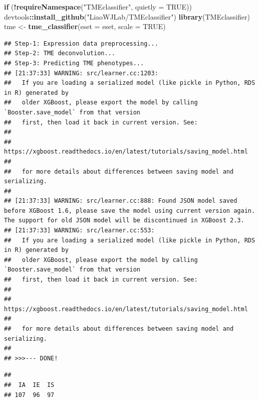 \documentclass[
  12pt,
]{book}
\newenvironment{Shaded}{\begin{snugshade}}{\end{snugshade}}
\newcommand{\AttributeTok}[1]{\textcolor[rgb]{0.13,0.29,0.53}{#1}}
\newcommand{\ConstantTok}[1]{\textcolor[rgb]{0.56,0.35,0.01}{#1}}
\newcommand{\ControlFlowTok}[1]{\textcolor[rgb]{0.13,0.29,0.53}{\textbf{#1}}}
\newcommand{\FunctionTok}[1]{\textcolor[rgb]{0.13,0.29,0.53}{\textbf{#1}}}
\newcommand{\NormalTok}[1]{#1}
\newcommand{\OtherTok}[1]{\textcolor[rgb]{0.56,0.35,0.01}{#1}}
\newcommand{\SpecialCharTok}[1]{\textcolor[rgb]{0.81,0.36,0.00}{\textbf{#1}}}
\newcommand{\StringTok}[1]{\textcolor[rgb]{0.31,0.60,0.02}{#1}}
\begin{document}
\begin{Shaded}
\begin{Highlighting}[]
\ControlFlowTok{if}\NormalTok{ (}\SpecialCharTok{!}\FunctionTok{requireNamespace}\NormalTok{(}\StringTok{"TMEclassifier"}\NormalTok{, }\AttributeTok{quietly =} \ConstantTok{TRUE}\NormalTok{)) devtools}\SpecialCharTok{::}\FunctionTok{install\_github}\NormalTok{(}\StringTok{"LiaoWJLab/TMEclassifier"}\NormalTok{)}
\FunctionTok{library}\NormalTok{(TMEclassifier)}
\NormalTok{tme }\OtherTok{\textless{}{-}} \FunctionTok{tme\_classifier}\NormalTok{(}\AttributeTok{eset =}\NormalTok{ eset, }\AttributeTok{scale =} \ConstantTok{TRUE}\NormalTok{)}
\end{Highlighting}
\end{Shaded}

\begin{verbatim}
## Step-1: Expression data preprocessing...
## Step-2: TME deconvolution...
## Step-3: Predicting TME phenotypes...
## [21:37:33] WARNING: src/learner.cc:1203: 
##   If you are loading a serialized model (like pickle in Python, RDS in R) generated by
##   older XGBoost, please export the model by calling `Booster.save_model` from that version
##   first, then load it back in current version. See:
## 
##     https://xgboost.readthedocs.io/en/latest/tutorials/saving_model.html
## 
##   for more details about differences between saving model and serializing.
## 
## [21:37:33] WARNING: src/learner.cc:888: Found JSON model saved before XGBoost 1.6, please save the model using current version again. The support for old JSON model will be discontinued in XGBoost 2.3.
## [21:37:33] WARNING: src/learner.cc:553: 
##   If you are loading a serialized model (like pickle in Python, RDS in R) generated by
##   older XGBoost, please export the model by calling `Booster.save_model` from that version
##   first, then load it back in current version. See:
## 
##     https://xgboost.readthedocs.io/en/latest/tutorials/saving_model.html
## 
##   for more details about differences between saving model and serializing.
## 
## >>>--- DONE!
\end{verbatim}

\begin{Shaded}
\end{Shaded}

\begin{verbatim}
## 
##  IA  IE  IS 
## 107  96  97
\end{verbatim}
\end{document}
